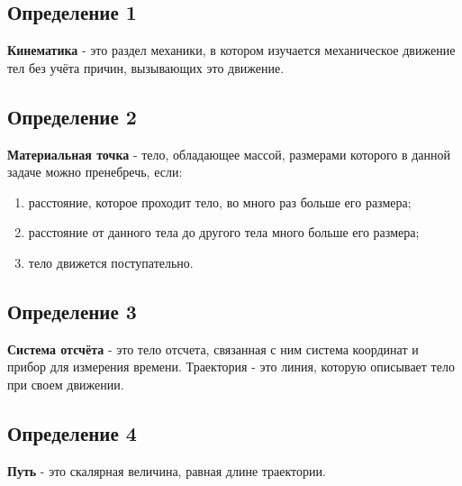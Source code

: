 \documentclass[a4paper,12pt]{article}
\begin{document}
\begin{center}
\end{center}

\subsection*{Определение 1}
\vspace{-3pt}
\textbf{Кинематика} - это раздел механики, в котором изучается механическое движение тел без учёта причин, вызывающих это движение.

\vspace{-10pt}

\subsection*{Определение 2}
\vspace{-3pt}
\textbf{Материальная точка} - тело, обладающее массой, размерами которого в данной задаче можно пренебречь, если:
\begin{enumerate}[itemsep=0pt, topsep=0pt, parsep=3pt]
  \item расстояние, которое проходит тело, во много раз больше его размера;
  \item расстояние от данного тела до другого тела много больше его размера;
  \item тело движется поступательно.
\end{enumerate}

\vspace{-10pt}

\subsection*{Определение 3}
\vspace{-3pt}
\textbf{Система отсчёта} - это тело отсчета, связанная с ним система координат и прибор для измерения времени. Траектория - это линия, которую описывает тело при своем движении.

\vspace{-10pt}

\subsection*{Определение 4}
\vspace{-3pt}
\textbf{Путь} - это скалярная величина, равная длине траектории.   

\vspace{-10pt}
\end{document}

